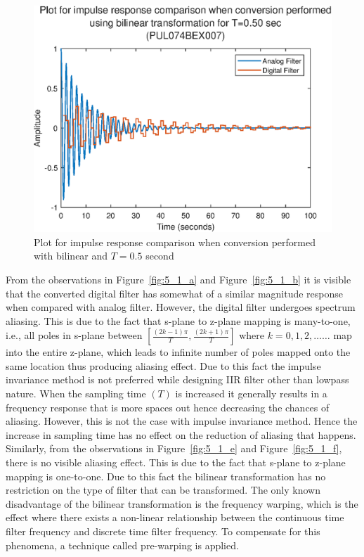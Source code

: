 \documentclass{lab_sheet}
\def\ddfrac#1#2{\displaystyle\frac{\displaystyle #1}{\displaystyle #2}}
\begin{document}
\begin{figure}[H]
    \centering
    \includegraphics[width=0.7\linewidth]{../Figures/impulse_res_bilinear transformation_1.eps}
    \caption{Plot for impulse response comparison when conversion performed with bilinear and $T=0.5$ second}
    \label{fig:5_1_h}
\end{figure}
From the observations in Figure~\ref{fig:5_1_a} and Figure~\ref{fig:5_1_b} it is visible that the converted digital filter has somewhat of a similar magnitude response when compared with analog filter. However, the digital filter undergoes spectrum aliasing. This is due to the fact that s-plane to z-plane mapping is many-to-one, i.e., all poles in s-plane between $\left[\ddfrac{(2k-1)\pi}{T},\ddfrac{(2k+1)\pi}{T}\right]$ where $k=0,1,2,\dots\dots$ map into the entire z-plane, which leads to infinite number of poles mapped onto the same location thus producing aliasing effect. Due to this fact the impulse invariance method is not preferred while designing IIR filter other than lowpass nature. When the sampling time $(T)$ is increased it generally results in a frequency response that is more spaces out hence decreasing the chances of aliasing. However, this is not the case with impulse invariance method. Hence the increase in sampling time has no effect on the reduction of aliasing that happens. \\
Similarly, from the observations in Figure~\ref{fig:5_1_e} and Figure~\ref{fig:5_1_f}, there is no visible aliasing effect. This is due to the fact that s-plane to z-plane mapping is one-to-one. Due to this fact the bilinear transformation has no restriction on the type of filter that can be transformed. The only known disadvantage of the bilinear transformation is the frequency warping, which is the effect where there exists a non-linear relationship between the continuous time filter frequency and discrete time filter frequency. To compensate for this phenomena, a technique called pre-warping is applied.
\end{document}
